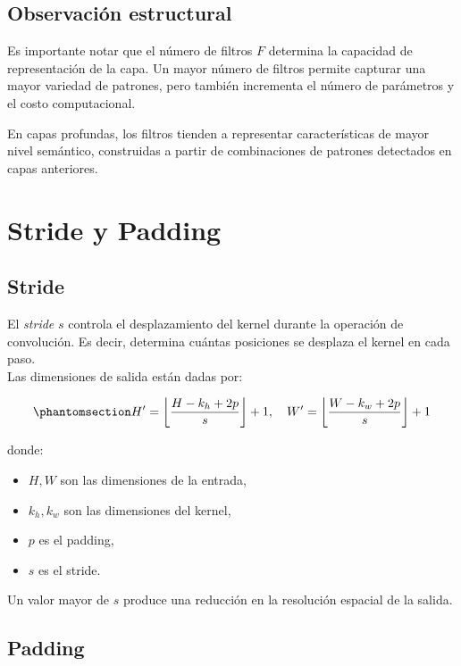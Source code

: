 \documentclass[
  spanish,
  us-letterpaper,
  DIV=11,
  numbers=noendperiod]{scrreprt}
\providecommand{\tightlist}{%
  \setlength{\itemsep}{0pt}\setlength{\parskip}{0pt}}
\begin{document}
\subsection{Observación estructural}\label{observaciuxf3n-estructural}

Es importante notar que el número de filtros \(F\) determina la
capacidad de representación de la capa. Un mayor número de filtros
permite capturar una mayor variedad de patrones, pero también incrementa
el número de parámetros y el costo computacional.

En capas profundas, los filtros tienden a representar características de
mayor nivel semántico, construidas a partir de combinaciones de patrones
detectados en capas anteriores.

\section{Stride y Padding}\label{stride-y-padding}

\subsection{Stride}\label{stride}

El \emph{stride} \(s\) controla el desplazamiento del kernel durante la
operación de convolución. Es decir, determina cuántas posiciones se
desplaza el kernel en cada paso.\\

Las dimensiones de salida están dadas por:

\begin{equation}\phantomsection\label{eq-output-dims}{
H' = \left\lfloor \frac{H - k_h + 2p}{s} \right\rfloor + 1, \quad
W' = \left\lfloor \frac{W - k_w + 2p}{s} \right\rfloor + 1
}\end{equation}

donde:

\begin{itemize}
\tightlist
\item
  \(H, W\) son las dimensiones de la entrada,
\item
  \(k_h, k_w\) son las dimensiones del kernel,
\item
  \(p\) es el padding,
\item
  \(s\) es el stride.
\end{itemize}

Un valor mayor de \(s\) produce una reducción en la resolución espacial
de la salida.

\subsection{Padding}\label{padding}
\end{document}
